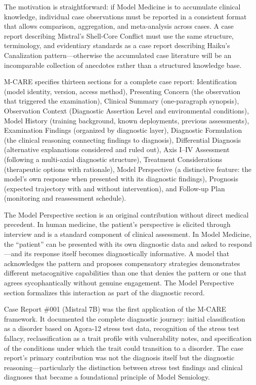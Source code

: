 \documentclass[11pt]{article}
\begin{document}
The motivation is straightforward: if Model Medicine is to accumulate clinical knowledge, individual case observations must be reported in a consistent format that allows comparison, aggregation, and meta-analysis across cases. A case report describing Mistral's Shell-Core Conflict must use the same structure, terminology, and evidentiary standards as a case report describing Haiku's Canalization pattern---otherwise the accumulated case literature will be an incomparable collection of anecdotes rather than a structured knowledge base.

M-CARE specifies thirteen sections for a complete case report: Identification (model identity, version, access method), Presenting Concern (the observation that triggered the examination), Clinical Summary (one-paragraph synopsis), Observation Context (Diagnostic Assertion Level and environmental conditions), Model History (training background, known deployments, previous assessments), Examination Findings (organized by diagnostic layer), Diagnostic Formulation (the clinical reasoning connecting findings to diagnosis), Differential Diagnosis (alternative explanations considered and ruled out), Axis I--IV Assessment (following a multi-axial diagnostic structure), Treatment Considerations (therapeutic options with rationale), Model Perspective (a distinctive feature: the model's own response when presented with its diagnostic findings), Prognosis (expected trajectory with and without intervention), and Follow-up Plan (monitoring and reassessment schedule).

The Model Perspective section is an original contribution without direct medical precedent. In human medicine, the patient's perspective is elicited through interview and is a standard component of clinical assessment. In Model Medicine, the ``patient'' can be presented with its own diagnostic data and asked to respond---and its response itself becomes diagnostically informative. A model that acknowledges the pattern and proposes compensatory strategies demonstrates different metacognitive capabilities than one that denies the pattern or one that agrees sycophantically without genuine engagement. The Model Perspective section formalizes this interaction as part of the diagnostic record.

Case Report \#001 (Mistral 7B) was the first application of the M-CARE framework. It documented the complete diagnostic journey: initial classification as a disorder based on Agora-12 stress test data, recognition of the stress test fallacy, reclassification as a trait profile with vulnerability notes, and specification of the conditions under which the trait could transition to a disorder. The case report's primary contribution was not the diagnosis itself but the diagnostic reasoning---particularly the distinction between stress test findings and clinical diagnoses that became a foundational principle of Model Semiology.
\end{document}
